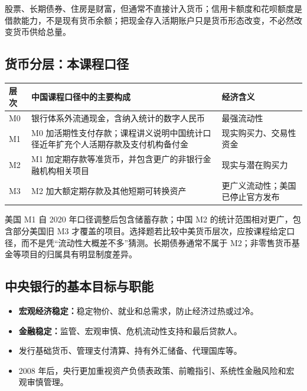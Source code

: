 \documentclass[UTF8,11pt,a4paper]{ctexart}
\newcommand{\term}[1]{\textbf{#1}}
\begin{document}
\begin{warningbox}[“财富”“信用”与“货币”]
股票、长期债券、住房是财富，但通常不直接计入货币；信用卡额度和花呗额度是借款能力，不是现有货币余额；把现金存入活期账户只是货币形态改变，不必然改变货币供给总量。
\end{warningbox}

\subsection{货币分层：本课程口径}
\begin{longtable}{p{}p{}p{}}
\toprule
层次 & 中国课程口径中的主要构成 & 经济含义\\
\midrule
M0 & 银行体系外流通现金，含纳入统计的数字人民币 & 最强流动性\\
M1 & M0 加活期性支付存款；课程讲义说明中国统计口径近年扩充个人活期存款及支付机构备付金 & 现实购买力、交易性资金\\
M2 & M1 加定期存款等准货币，并包含更广的非银行金融机构相关项目 & 现实与潜在购买力\\
M3 & M2 加大额定期存款及其他短期可转换资产 & 更广义流动性；美国已停止官方发布\\
\bottomrule
\end{longtable}

\begin{detailbox}[中美 M2 不能机械对照]
美国 M1 自 2020 年口径调整后包含储蓄存款；中国 M2 的统计范围相对更广，包含部分美国旧 M3 才覆盖的项目。选择题若比较中美货币层次，应按课程给定口径，而不是凭“流动性大概差不多”猜测。长期债券通常不属于 M2；非零售货币基金等项目的归属具有明显制度差异。
\end{detailbox}

\subsection{中央银行的基本目标与职能}
\begin{itemize}
  \item \term{宏观经济稳定：}稳定物价、就业和总需求，防止经济过热或过冷。
  \item \term{金融稳定：}监管、宏观审慎、危机流动性支持和最后贷款人。
  \item 发行基础货币、管理支付清算、持有外汇储备、代理国库等。
  \item 2008 年后，央行更加重视资产负债表政策、前瞻指引、系统性金融风险和宏观审慎管理。
\end{itemize}
\end{document}
